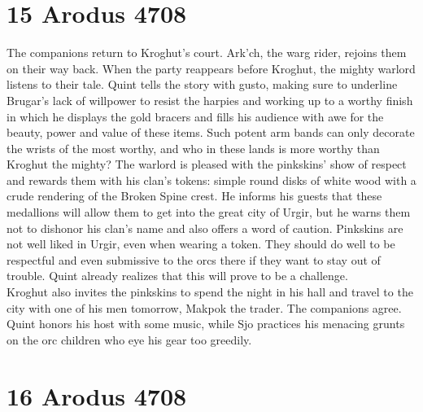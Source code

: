 \section{15 Arodus 4708}

The companions return to Kroghut's court. Ark'ch, the warg rider, rejoins them on their way back. When the party reappears before Kroghut, the mighty warlord listens to their tale. Quint tells the story with gusto, making sure to underline Brugar's lack of willpower to resist the harpies and working up to a worthy finish in which he displays the gold bracers and fills his audience with awe for the beauty, power and value of these items. Such potent arm bands can only decorate the wrists of the most worthy, and who in these lands is more worthy than Kroghut the mighty? The warlord is pleased with the pinkskins' show of respect and rewards them with his clan's tokens: simple round disks of white wood with a crude rendering of the Broken Spine crest. He informs his guests that these medallions will allow them to get into the great city of Urgir, but he warns them not to dishonor his clan's name and also offers a word of caution. Pinkskins are not well liked in Urgir, even when wearing a token. They should do well to be respectful and even submissive to the orcs there if they want to stay out of trouble. Quint already realizes that this will prove to be a challenge.\\

Kroghut also invites the pinkskins to spend the night in his hall and travel to the city with one of his men tomorrow, Makpok the trader. The companions agree. Quint honors his host with some music, while Sjo practices his menacing grunts on the orc children who eye his gear too greedily.\\

\section{16 Arodus 4708}

